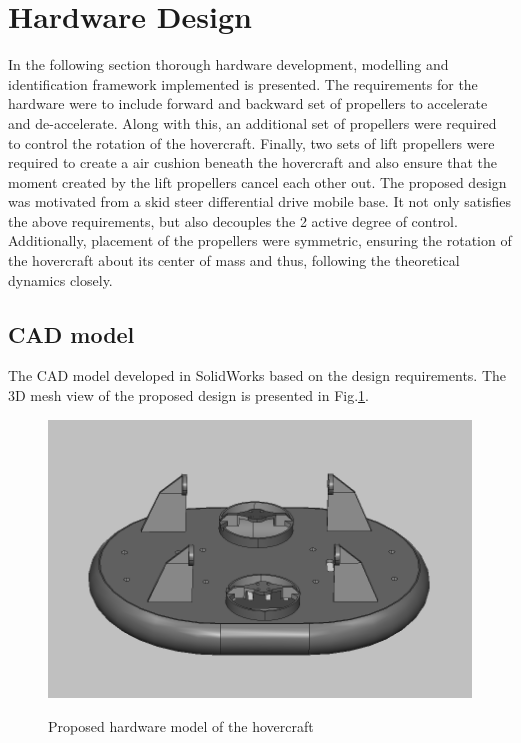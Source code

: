 \documentclass[12pt,titlepage]{article}
\begin{document}
\section{Hardware Design}
In the following section thorough hardware development, modelling and identification framework implemented is presented. The requirements for the hardware were to include forward and backward set of propellers to accelerate and de-accelerate. Along with this, an additional set of propellers were required to control the rotation of the hovercraft. Finally, two sets of lift propellers were required to create a air cushion beneath the hovercraft and also ensure that the moment created by the lift propellers cancel each other out. The proposed design was motivated from a skid steer differential drive mobile base. It not only satisfies the above requirements, but also decouples the 2 active degree of control. Additionally, placement of the propellers were symmetric, ensuring the rotation of the hovercraft about its center of mass and thus, following the theoretical dynamics closely. 

\subsection{CAD model}
The CAD model developed in SolidWorks based on the design requirements. The 3D mesh view of the proposed design is presented in Fig.\ref{fig:cad}.

\begin{figure}[H]
    \centering
    \includegraphics[width=0.8\columnwidth]{Images/proposed_hardware_model.PNG}\\
    \caption{Proposed hardware model of the hovercraft}
    \label{fig:cad}
\end{figure}
\end{document}
